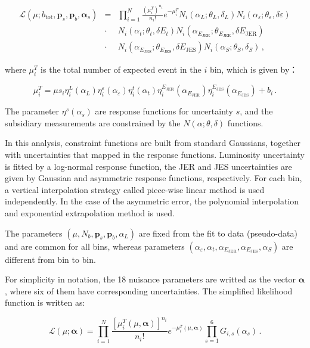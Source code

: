 \begin{eqnarray}
\mathcal{L}(\mu;b_\mathrm{tot},\bm{p}_s,\bm{p}_b,\bm{\alpha}_s)
& = & \prod_{i=1}^N \frac{(\mu^T_i)^{n_i}}{n_i! } e^{-\mu^T_i}
N_i(\alpha_L;\theta_L,\delta_L)
N_i(\alpha_\varepsilon;\theta_\varepsilon,\delta\varepsilon)\nonumber\\
& \cdot &
N_i(\alpha_t;\theta_t,\delta E_t)
N_i(\alpha_{E_\mathrm{JER}};\theta_{E_\mathrm{JER}},\delta E_\mathrm{JER})\\
& \cdot &
N_i(\alpha_{E_\mathrm{JES}};\theta_{E_\mathrm{JES}},\delta E_\mathrm{JES})
N_i(\alpha_S;\theta_S,\delta_S)\, ,
\end{eqnarray}

\noindent
where $\mu^T_i$ is the total number of expected event in the $i$ bin, which is
given by：

\begin{equation}
\mu^T_i = \mu s_i 
\eta^L_i(\alpha_L) 
\eta^\varepsilon_i(\alpha_\varepsilon) 
\eta^t_i(\alpha_t)
\eta^{E_\mathrm{JER}}_i (\alpha_{E_\mathrm{JER}})
\eta^{E_\mathrm{JES}}_i (\alpha_{E_\mathrm{JES}}) + b_i \, .
\end{equation}

\noindent
The parameter $\eta^s(\alpha_s)$ are response functions for uncertainty $s$, and
the subsidiary measurements are constrained by the
$N(\alpha;\theta,\delta)$ functions. 

In this analysis, constraint functions are built from standard Gaussians, together with uncertainties that mapped in the response functions. Luminosity uncertainty is fitted by a log-normal response function, the JER and JES uncertainties are given by Gaussian and asymmetric response functions, respectively. For each bin, a vertical interpolation strategy called piece-wise linear method is used independently. In the case of the asymmetric error, the polynomial interpolation and exponential extrapolation method is used.

The parameters $(\mu,N_b,\bm{p}_s,\bm{p}_b,\alpha_L)$ are fixed from the fit to data (pseudo-data) and are common for all bins, whereas parameters
$(\alpha_\varepsilon,\alpha_t,\alpha_{E_\mathrm{JER}},\alpha_{E_\mathrm{JES}},\alpha_S)$ 
are different from bin to bin.

For simplicity in notation, the 18 nuisance parameters are writted as the
vector $\bm{\alpha}$, where six of them have corresponding uncertainties.
The simplified likelihood function is written as:

\begin{equation}
\mathcal{L}(\mu;\bm{\alpha}) = \prod_{i=1}^N
\frac{[\mu^T_i(\mu,\bm{\alpha})]^{n_i}}{n_i!} e^{-\mu^T_i(\mu,\bm{\alpha})}
\prod_{s=1}^6 G_{i,s}(\alpha_s)\, .
\end{equation}

